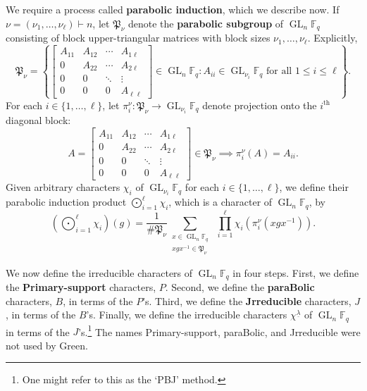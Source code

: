 \documentclass[10pt]{article}
\theoremstyle{definition}
\DeclareMathOperator{\GL}{GL}
\newcommand{\F}{\mathbb{F}}
\newcommand{\myemph}{\textbf}
\newcommand{\para}{\mathfrak{P}}
\newcommand{\ulambda}{{\underline{\lambda}}}
\begin{document}
We require a process called \myemph{parabolic induction}, which we describe now.
If $\nu = (\nu_1,\ldots,\nu_\ell) \vdash n$, let $\para_\nu$ denote the \myemph{parabolic subgroup} of $\GL_{n} \F_q$ consisting of block upper-triangular matrices with block sizes $\nu_1, \ldots, \nu_\ell$. Explicitly,
\begin{equation}
\label{para_def}
\para_\nu = \left \{
\begin{bmatrix}
A_{11} & A_{12} & \cdots & A_{1 \ell} \\
0 & A_{22} & \cdots & A_{2 \ell} \\
0 & 0 & \ddots & \vdots \\
0 & 0 & 0 & A_{\ell \ell}
\end{bmatrix} \in \GL_{n} \F_q :
A_{ii} \in \GL_{\nu_i} \F_q \text{ for all } 1 \leq i \leq \ell
\right \}.
\end{equation}
For each $i \in \{1,\ldots,\ell\}$, let $\pi_i^\nu : \para_{\nu} \to \GL_{\nu_i} \F_q$ denote projection
onto the $i^\text{th}$ diagonal block:
\begin{equation}
A = \begin{bmatrix}
A_{11} & A_{12} & \cdots & A_{1 \ell} \\
0 & A_{22} & \cdots & A_{2 \ell} \\
0 & 0 & \ddots & \vdots \\
0 & 0 & 0 & A_{\ell \ell}
\end{bmatrix}
\in \para_\nu
\implies
\pi_i^\nu (A) = A_{ii}.
\end{equation}
Given arbitrary characters $\chi_i$ of $\GL_{\nu_i} \F_q$ for each $i \in \{1,\ldots,\ell\}$,
we define their parabolic induction product $\bigodot_{i = 1}^\ell \chi_i$, which is a character of $\GL_{n} \F_q$, by
\begin{equation} \label{parabolic_induction} \left(\bigodot_{i = 1}^\ell \chi_i \right) (g) = \frac{1}{\# \para_\nu} \sum_{\substack{x \in \GL_{n} \F_q \\ xgx^{-1} \in \para_\nu}} \, \, \prod_{i = 1}^{\ell} \chi_i \left ( \pi^\nu_i ( xgx^{-1} ) \right ). \end{equation}

We now define the irreducible characters of $\GL_n \F_q$ in four steps. First, we define the \myemph{Primary-support} characters, $P$.
Second, we define the \myemph{paraBolic} characters, $B$, in terms of the $P$'s.
Third, we define the \myemph{Jrreducible} characters, $J$, in terms of the $B$'s.
Finally, we define the irreducible characters \(\chi^\ulambda\) of \(\GL_n \F_q\) in terms of the $J$'s.\footnote{One might refer to this as the `PBJ' method.}
The names Primary-support, paraBolic, and Jrreducible were not used by Green.
\end{document}
